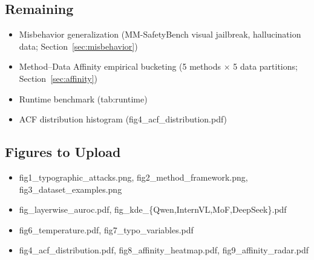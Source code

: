\documentclass[preprint,12pt]{elsarticle}
\begin{document}
\subsection*{Remaining}
\begin{itemize}[leftmargin=*]
    \item[\square] Misbehavior generalization (MM-SafetyBench visual jailbreak, hallucination data; Section~\ref{sec:misbehavior})
    \item[\square] Method--Data Affinity empirical bucketing (5 methods $\times$ 5 data partitions; Section~\ref{sec:affinity})
    \item[\square] Runtime benchmark (tab:runtime)
    \item[\square] ACF distribution histogram (fig4\_acf\_distribution.pdf)
\end{itemize}

\subsection*{Figures to Upload}
\begin{itemize}[leftmargin=*]
    \item[\checkmark] fig1\_typographic\_attacks.png, fig2\_method\_framework.png, fig3\_dataset\_examples.png
    \item[\checkmark] fig\_layerwise\_auroc.pdf, fig\_kde\_\{Qwen,InternVL,MoF,DeepSeek\}.pdf
    \item[\checkmark] fig6\_temperature.pdf, fig7\_typo\_variables.pdf
    \item[\square] fig4\_acf\_distribution.pdf, fig8\_affinity\_heatmap.pdf, fig9\_affinity\_radar.pdf
\end{itemize}




\end{document}
